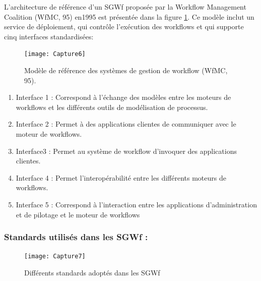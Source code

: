  L'architecture de référence d’un SGWf proposée par la Workflow Management Coalition (WfMC, 95) en1995 est présentée dans la figure \ref{fig:capture6}. Ce modèle inclut un service de déploiement, qui contrôle l'exécution des workflows et qui supporte cinq interfaces standardisées:
 
 
\begin{figure}[!h]
	\centering
	\texttt{[image: Capture6]}
	\caption{ Modèle de référence des systèmes de gestion de workflow (WfMC, 95). }
	\label{fig:capture6}
\end{figure}


\begin{enumerate}
\item  Interface 1 : Correspond à l’échange des modèles entre les moteurs de workflows et les différents outils de modélisation de processus. \item Interface 2 : Permet à des applications clientes de communiquer avec le moteur de workflows. \item Interface3 : Permet au système de workflow d’invoquer des applications clientes. \item  Interface 4 : Permet l’interopérabilité entre les différents moteurs de workflows.\item  Interface 5 : Correspond à l’interaction entre les applications d’administration et de pilotage et le moteur de workflows

\end{enumerate}
\subsubsection{Standards utilisés dans les SGWf :}

\begin{figure}[!h]
	\centering
	\texttt{[image: Capture7]}
	\caption{Différents standards adoptés dans les SGWf}
	\label{fig:capture7}
\end{figure}


